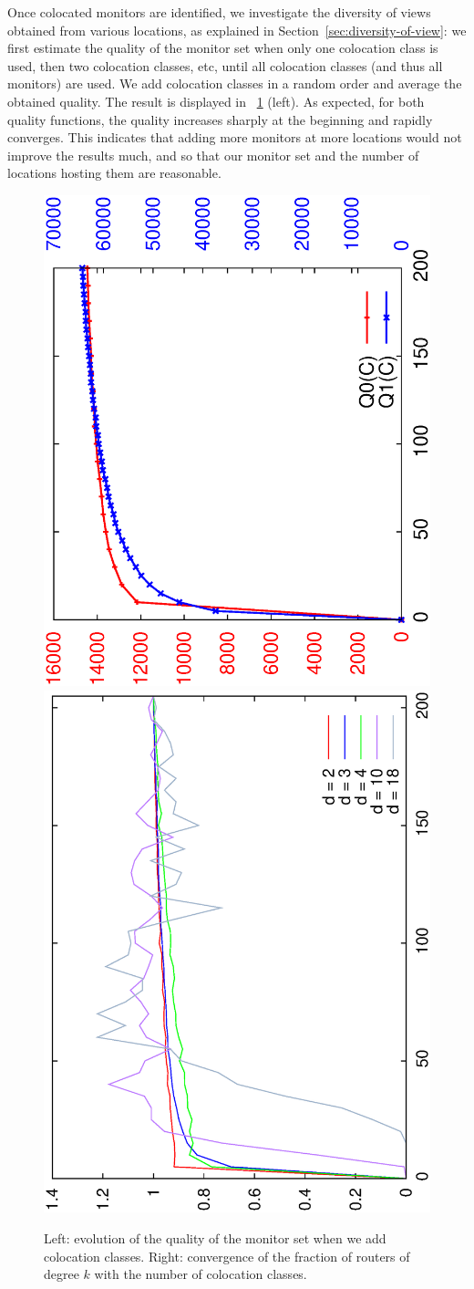 \documentclass[conference]{IEEEtran}
\newcommand{\noteperso}[1]{\begin{center}
\fbox{\begin{minipage}{0.9\columnwidth}#1\end{minipage}}\end{center}}
\begin{document}
Once colocated monitors are identified, we investigate the diversity of views obtained from various locations, as explained in Section~\ref{sec:diversity-of-view}: we first estimate the quality of the monitor set when only one colocation class is used, then two colocation classes, etc, until all colocation classes (and thus all monitors) are used. We add colocation classes in a random order and average the obtained quality. The result is displayed in \figurename~\ref{fig:quality-classes} (left). As expected, for both quality functions, the quality increases sharply at the beginning and rapidly converges. This indicates that adding more monitors at more locations would not improve the results much, and so that our monitor set and the number of locations hosting them are reasonable.


\begin{figure} \centering
\hfill
\includegraphics[angle=-90,width=0.49\columnwidth]{figures/quality-classes}
\hfill
\includegraphics[angle=-90,width=0.49\columnwidth]{figures/classes-propdeg}
\hfill
\caption{
Left: evolution of the quality of the monitor set when we add colocation classes.
Right: convergence of the fraction of routers of degree $k$ with the number of colocation classes.
}
\label{fig:propdeg-classes}
\label{fig:quality-classes}
\end{figure}
\end{document}
